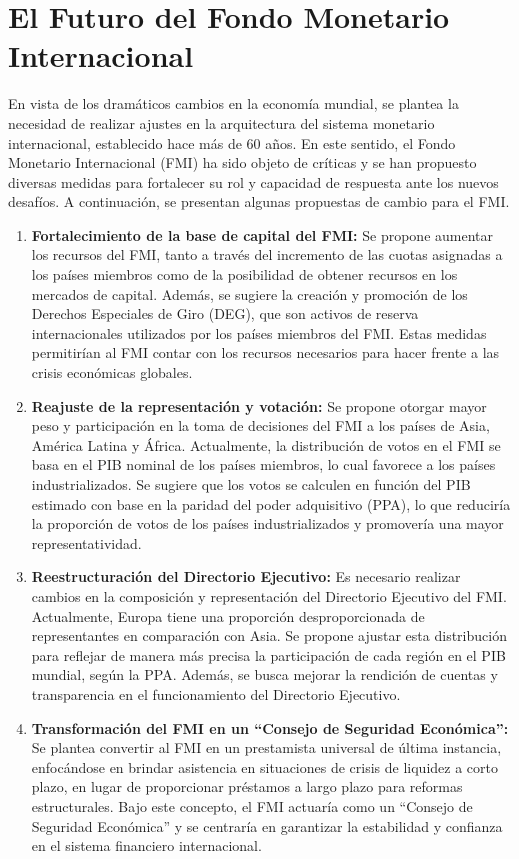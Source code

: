 \documentclass[
  a4paper,
]{article}
\begin{document}
\hypertarget{el-futuro-del-fondo-monetario-internacional}{%
\section{El Futuro del Fondo Monetario
Internacional}\label{el-futuro-del-fondo-monetario-internacional}}

En vista de los dramáticos cambios en la economía mundial, se plantea la
necesidad de realizar ajustes en la arquitectura del sistema monetario
internacional, establecido hace más de 60 años. En este sentido, el
Fondo Monetario Internacional (FMI) ha sido objeto de críticas y se han
propuesto diversas medidas para fortalecer su rol y capacidad de
respuesta ante los nuevos desafíos. A continuación, se presentan algunas
propuestas de cambio para el FMI.

\begin{enumerate}
\def\labelenumi{\arabic{enumi}.}
\item
  \textbf{Fortalecimiento de la base de capital del FMI:} Se propone
  aumentar los recursos del FMI, tanto a través del incremento de las
  cuotas asignadas a los países miembros como de la posibilidad de
  obtener recursos en los mercados de capital. Además, se sugiere la
  creación y promoción de los Derechos Especiales de Giro (DEG), que son
  activos de reserva internacionales utilizados por los países miembros
  del FMI. Estas medidas permitirían al FMI contar con los recursos
  necesarios para hacer frente a las crisis económicas globales.
\item
  \textbf{Reajuste de la representación y votación:} Se propone otorgar
  mayor peso y participación en la toma de decisiones del FMI a los
  países de Asia, América Latina y África. Actualmente, la distribución
  de votos en el FMI se basa en el PIB nominal de los países miembros,
  lo cual favorece a los países industrializados. Se sugiere que los
  votos se calculen en función del PIB estimado con base en la paridad
  del poder adquisitivo (PPA), lo que reduciría la proporción de votos
  de los países industrializados y promovería una mayor
  representatividad.
\item
  \textbf{Reestructuración del Directorio Ejecutivo:} Es necesario
  realizar cambios en la composición y representación del Directorio
  Ejecutivo del FMI. Actualmente, Europa tiene una proporción
  desproporcionada de representantes en comparación con Asia. Se propone
  ajustar esta distribución para reflejar de manera más precisa la
  participación de cada región en el PIB mundial, según la PPA. Además,
  se busca mejorar la rendición de cuentas y transparencia en el
  funcionamiento del Directorio Ejecutivo.
\item
  \textbf{Transformación del FMI en un ``Consejo de Seguridad
  Económica'':} Se plantea convertir al FMI en un prestamista universal
  de última instancia, enfocándose en brindar asistencia en situaciones
  de crisis de liquidez a corto plazo, en lugar de proporcionar
  préstamos a largo plazo para reformas estructurales. Bajo este
  concepto, el FMI actuaría como un ``Consejo de Seguridad Económica'' y
  se centraría en garantizar la estabilidad y confianza en el sistema
  financiero internacional.
\end{enumerate}
\end{document}
